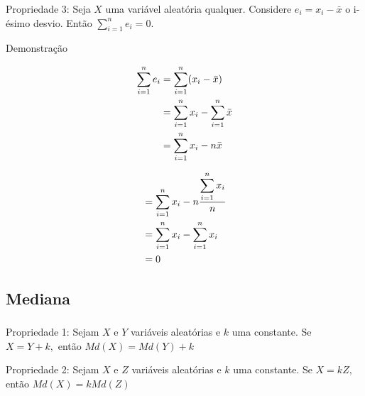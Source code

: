 \documentclass[14pt,aspectratio=1610]{beamer}
\begin{document}
\begin{frame}{}
	\frametitle{}
	\begin{block}{Propriedade 3:}
		\justifying
		Seja $X$ uma variável aleatória qualquer. Considere $e_{i}=x_{i}-\bar{x}$ o i-ésimo desvio. Então $\sum_{i=1}^{n}e_{i}=0.$
	\end{block}
	\pause
	\begin{block}{Demonstração}
		\begin{minipage}{0.4\textwidth}
			\begin{align*}
				{\displaystyle \sum_{i=1}^{n}e_{i}}&=
				{\displaystyle \sum_{i=1}^{n}(x_{i}-\bar{x})}\\ 
				\vspace{0.1cm}
				&={\displaystyle \sum_{i=1}^{n}x_{i}-\sum_{i=1}^{n}\bar{x}}\\ \vspace{0.1cm}
				&={\displaystyle \sum_{i=1}^{n}x_{i}}-n\bar{x}\\
			\end{align*}
		\end{minipage}\pause\hfill
		\begin{minipage}{0.4\textwidth}
			\begin{align*}
				&={\displaystyle \sum_{i=1}^{n}x_{i}}-n \dfrac{{\displaystyle\sum_{i=1}^{n}x_{i}}}{n}\\ \vspace{0.1cm}
				&={\displaystyle \sum_{i=1}^{n}x_{i}}- {\displaystyle\sum_{i=1}^{n}x_{i}}\\ \vspace{0.1cm}
				&=0\\
			\end{align*}
		\end{minipage}
	\end{block}
\end{frame}

\subsection{Mediana}
\begin{frame}{}
	\frametitle{}
	\begin{block}{Propriedade 1:}
		\justifying
		Sejam $X$ e $Y$ variáveis aleatórias e $k$ uma constante. Se $X=Y+k,$ então $Md(X)=Md(Y)+k$
	\end{block}
	\pause
	\begin{block}{Propriedade 2:}
		\justifying
		Sejam $X$ e $Z$ variáveis aleatórias e $k$ uma constante. Se $X=kZ,$ então $Md(X)=kMd(Z)$
	\end{block}
\end{frame}
\end{document}
